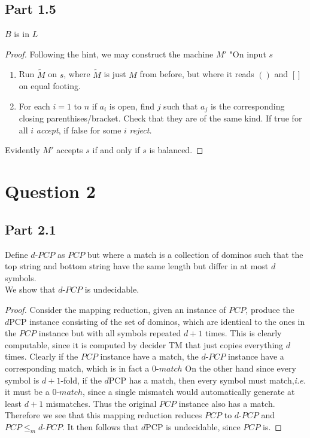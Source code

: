 \documentclass[a4paper,11pt]{article}
\newcommand{\ie}{\emph{i.e.} }
\numberwithin{equation}{section}
\begin{document}
\subsection*{Part 1.5}
$ B $ is in $ L $\begin{proof}
	Following the hint, we may construct the machine $ M' $ "On input $ s $\begin{enumerate}
		\item Run $ \tilde{M} $ on $ s $, where $ \tilde{M} $ is just $ M $ from before, but where it reads $ () $ and $ [] $ on equal footing.
		\item For each $ i=1 $ to $ n $ if $ a_i $ is open, find $ j $ such that $ a_j $ is the corresponding closing parenthises/bracket. Check that they are of the same kind. If true for all $ i $ \emph{accept}, if false for some $ i $ \emph{reject.}
		\end{enumerate}
		Evidently $ M' $ accepts $ s $ if and only if $ s $ is balanced.
\end{proof}
\section*{Question 2}
\subsection*{Part 2.1}
Define $ d\text{-}PCP $ as $ PCP $ but where a match is a collection of dominos such that the top string and bottom string have the same length but differ in at most $ d $ symbols.\\
We show that $ d\text{-}PCP $ is undecidable. \begin{proof}
	Consider the mapping reduction, given an instance of $ PCP $, produce the $ d\text{PCP} $ instance consisting of the set of dominos, which are identical to the ones in the $ PCP $ instance but with all symbols repeated $ d+1 $ times. This is clearly computable, since it is computed by decider TM that just copies everything $ d $ times. Clearly if the $ PCP $ instance have a match, the $ d\text{-}PCP $ instance have a corresponding match, which is in fact a  $ 0\text{-}match $ On the other hand since every symbol is $ d+1 $-fold, if the $ d\text{PCP} $ has a match, then every symbol must match,\ie it must be a $ 0\text{-}match $, since a single mismatch would automatically generate at least $ d+1 $ mismatches. Thus the original $ PCP $ instance also has a match. Therefore we see that this mapping reduction reduces $ PCP $ to $ d\text{-}PCP $ and $ PCP\leq_m d\text{-}PCP $. It then follows that $ d\text{PCP} $ is undecidable, since $ PCP $ is.
\end{proof}
\end{document}
